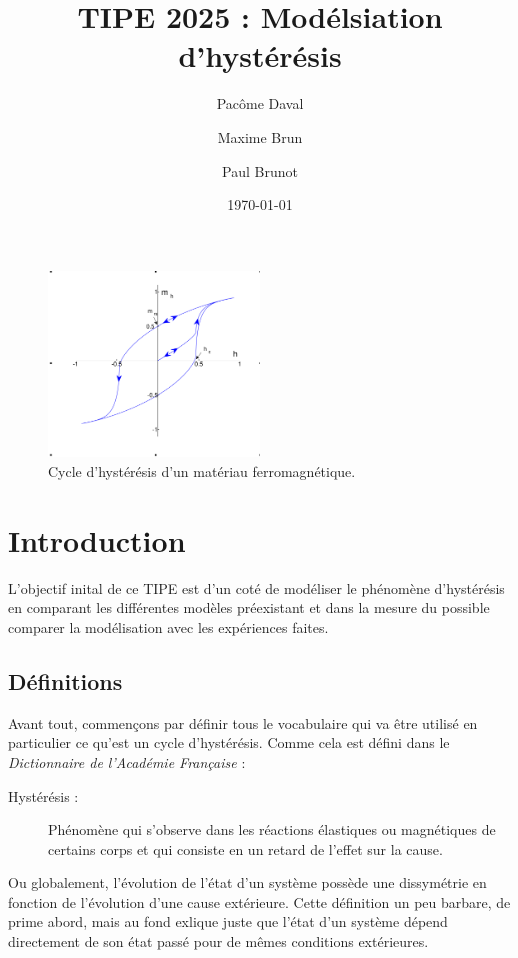 \documentclass[11pt]{article}
\begin{document}
\title{TIPE 2025 : Modélsiation d'hystérésis}
\author{Pacôme Daval \and Maxime Brun \and Paul Brunot}
\date{\today}
\maketitle

\begin{figure}[H]
    \centering
    \includegraphics[width=0.5\textwidth]{Hysteresiscurve.png}
    \caption{Cycle d'hystérésis d'un matériau ferromagnétique.}
    \label{fig:hysteresis_title}
\end{figure}

\newpage

\tableofcontents
\newpage

\section{Introduction}

L'objectif inital de ce TIPE est d'un coté de modéliser le phénomène d'hystérésis en comparant les différentes
modèles préexistant et dans la mesure du possible comparer la modélisation avec les expériences faites.

\subsection{Définitions}
Avant tout, commençons par définir tous le vocabulaire qui va être utilisé en particulier ce qu'est un cycle d'hystérésis.
Comme cela est défini dans le \textit{Dictionnaire de l'Académie Française} : 
\begin{description}
    \item[Hystérésis :] Phénomène qui s'observe dans les réactions élastiques ou magnétiques de certains corps et qui consiste en un retard de l'effet sur la cause.
\end{description}

Ou globalement, l'évolution de l'état d'un système possède une dissymétrie en fonction de l'évolution d'une cause extérieure.
Cette définition un peu barbare, de prime abord, mais au fond exlique juste que l'état d'un système dépend directement de son état passé pour de mêmes conditions extérieures.
\end{document}
